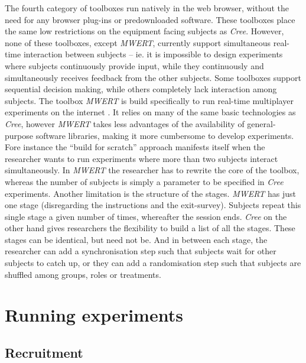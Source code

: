 \documentclass[preprint, 12pt]{elsarticle}
\newcommand{\Cree}{\emph{Cree}\xspace}
\begin{document}

The fourth category of toolboxes run natively in the web browser, without the need for any browser plug-ins or predownloaded software. These toolboxes place the same low restrictions on the equipment facing subjects as \Cree. However, none of these toolboxes, except \emph{MWERT}, currently support simultaneous real-time interaction between subjects -- ie. it is impossible to design experiments where subjects continuously provide input, while they continuously and simultaneously receives feedback from the other subjects. Some toolboxes support sequential decision making, while others completely lack interaction among subjects. The toolbox \emph{MWERT} is build specifically to run real-time multiplayer experiments on the internet \citep{Hawkins_2014}. It relies on many of the same basic technologies as \Cree, however \emph{MWERT} takes less advantages of the availability of general-purpose software libraries, making it more cumbersome to develop experiments. Fore instance the ``build for scratch'' approach manifests itself when the researcher wants to run experiments where more than two subjects interact simultaneously. In \emph{MWERT} the researcher has to rewrite the core of the toolbox, whereas the number of subjects is simply a parameter to be specified in \Cree experiments. Another limitation is the structure of the stages. \emph{MWERT} has just one stage (disregarding the instructions and the exit-survey). Subjects repeat this single stage a given number of times, whereafter the session ends. \Cree on the other hand gives researchers the flexibility to build a list of all the stages. These stages can be identical, but need not be. And in between each stage, the researcher can add a synchronisation step such that subjects wait for other subjects to catch up, or they can add a randomisation step such that subjects are shuffled among groups, roles or treatments.

\section{Running experiments}
\label{S:Running}

\subsection{Recruitment}
\end{document}
